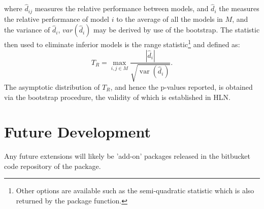 where $\hat d_{ij}$ measures the relative performance between models, and $\hat d_i$ the measures the relative performance of
model $i$ to the average of all the models in $M$, and the variance of $\hat d_i$, $var(\hat d_i)$ may be derived by use of
the bootstrap. The statistic then used to eliminate inferior models is the range statistic\footnote{Other options
are available such as the semi-quadratic statistic which is also returned by
the package function.} and defined as:
\begin{equation}\label{mcs6}
{T_R} = \mathop {\max }\limits_{i,j \in M} \frac{{\left| {{{\hat d}_i}} \right|}}
{{\sqrt {\operatorname{var} \left( {{{\hat d}_i}} \right)} }}.
\end{equation}
The asymptotic distribution of $T_R$, and hence the p-values reported, is obtained via the bootstrap procedure, the validity
of which is established in HLN.

\section{Future Development}\label{section:fut}
Any future extensions will likely be 'add-on' packages released in the bitbucket
code repository of the package.

